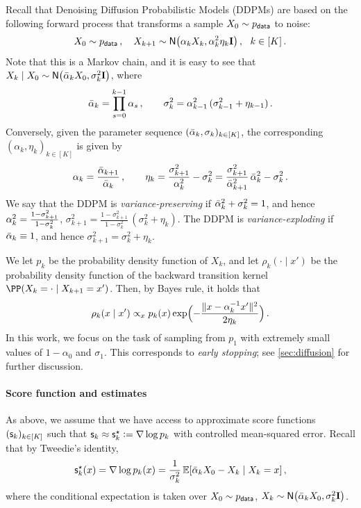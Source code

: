 


Recall that Denoising Diffusion Probabilistic Models (DDPMs) are based on the following forward process that transforms a sample $X_0\sim \pdata$ to noise:
\begin{align}\label{eq:forward}
    X_0\sim \pdata\,, \quad 
    X_{k+1}\sim \normal{\alp_k X_k, \alp_k^2 \eta_k\Id}\,,~~k\in[K]\,.
\end{align}
Note that this is a Markov chain, and it is easy to see that $X_k\mid X_0\sim \normal{\alpbar_k X_0, \sigma_k^2\Id}$, where 
\begin{align}\notag
    \alpbar_k=\prod_{s=0}^{k-1} \alp_s\,, \qquad \sigma_k^2=\alp_{k-1}^2\,(\sigma_{k-1}^2+\eta_{k-1})\,.
\end{align}
Conversely, given the parameter sequence $(\alpbar_k, \sigma_k)_{k\in[K]}$, the corresponding $(\alpha_k, \eta_k)_{k\in[K]}$ is given by
\begin{align}\notag
    \alpha_k=\frac{\alpbar_{k+1}}{\alpbar_k}\,, \qquad
    \eta_k=\frac{\sigma_{k+1}^2}{\alpha_k^2}-\sigma_k^2
    =\frac{\sigma_{k+1}^2}{\alpbar_{k+1}^2}\,\alpbar_k^2-\sigma_k^2\,.
\end{align}
We say that the DDPM is \emph{variance-preserving} if $\alpbar_k^2+\sigma_k^2=1$, and hence $\alp_k^2=\frac{1-\sigma_{k+1}^2}{1-\sigma_k^2}$, $\sigma_{k+1}^2=\frac{1-\sigma_{k+1}^2}{1-\sigma_k^2}\,(\sigma_{k}^2+\eta_{k})$. The DDPM is \emph{variance-exploding} if $\alpbar_k\equiv 1$, and hence $\sigma_{k+1}^2=\sigma_{k}^2+\eta_{k}$.

We let $p_k$ be the probability density function of $X_k$, and let $\rho_k(\cdot\mid x')$ be the probability density function of the backward transition kernel $\PP(X_k=\cdot\mid X_{k+1}=x')$. Then, by Bayes rule, it holds that
\begin{align}\label{eq:backward_kernel}
    \rho_k(x\mid x')\propto_x p_k(x) \exp\prn[\Big]{-\frac{\nrm{x-\alp_k^{-1}x'}^2}{2\eta_k}}\,.
\end{align} 
In this work, we focus on the task of sampling from $p_1$ with extremely small values of $1-\alpha_0$ and $\sigma_1$. 
This corresponds to \emph{early stopping}; see \cref{sec:diffusion} for further discussion. %






\paragraph{Score function and estimates}
As above, we assume that we have access to approximate score functions $(\scf_k)_{k\in[K]}$ such that $\scf_k\approx \scfs_k\ldef \nabla \log p_k$ with controlled mean-squared error. Recall that by Tweedie's identity,
\begin{align}
    \scfs_k(x)=\nabla \log p_k(x)=\frac{1}{\sigma_k^2}\En[\alpbar_k X_0-X_k\mid X_k=x]\,,
\end{align}
where the conditional expectation is taken over $X_0\sim \pdata$, $X_k\sim \normal{\alpbar_k X_0, \sigma_k^2\Id}$.



